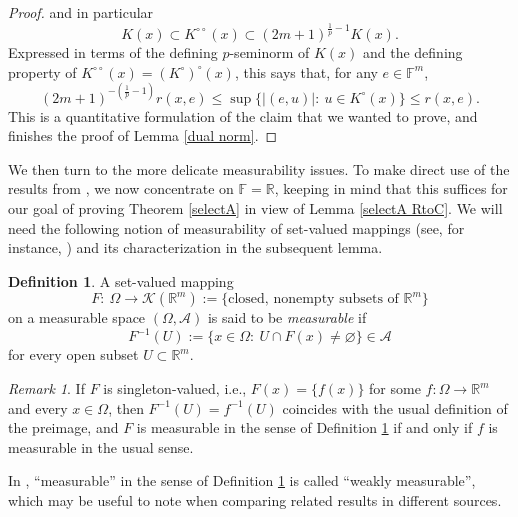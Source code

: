 \documentclass[11pt, reqno]{amsart}
\theoremstyle{definition}
\newtheorem{definition}[theorem]{Definition}
\theoremstyle{remark}
\newtheorem{remark}[theorem]{Remark}
\numberwithin{equation}{section}
\newcommand{\As}{\mathcal A}
\newcommand{\F}{\mathbb F}
\newcommand{\R}{\mathbb R}
\begin{document}
\begin{proof}
and in particular
\begin{equation*}
K(x)\subset K^{\circ\circ}(x)\subset (2m+1)^{\frac1p-1}K(x).
\end{equation*}
Expressed in terms of the defining $p$-seminorm of $K(x)$
and the defining property of $K^{\circ\circ}(x)=(K^{\circ})^{\circ}(x)$,
this says that, for any $e\in \mathbb F^m$,
\begin{equation*}
(2m+1)^{-(\frac1p-1)}r(x,e)
\leq \sup\{|(e,u)|:\ u\in K^{\circ}(x)\}
\leq r(x,e).
\end{equation*}
This is a quantitative formulation of the claim that we wanted to prove, and finishes the proof of Lemma \ref{dual norm}.
\end{proof}

We then turn to the more delicate measurability issues.
To make direct use of the results from \cite{BCU},
we now concentrate on $\F=\R$, keeping in mind that
this suffices for our goal of proving Theorem \ref{selectA}
in view of Lemma \ref{selectA RtoC}. We will need
the following notion of measurability of set-valued mappings
(see, for instance, \cite[Definition 8.1.1]{AF09})
and its characterization in the subsequent lemma.

\begin{definition}\label{def F meas}
A set-valued mapping
\begin{equation}\label{K(Rm)}
F:\ \Omega\to\mathcal K(\R^m):=\{\text{closed, nonempty subsets of }\R^m\}
\end{equation}
on a measurable space $(\Omega,\As)$ is said to be {\em measurable} if
\begin{equation*}
F^{-1}(U):=\{x\in\Omega:\ U\cap F(x)\neq\varnothing\}\in\As
\end{equation*}
for every open subset $U\subset\R^m$.
\end{definition}

\begin{remark}
If $F$ is singleton-valued, i.e., $F(x)=\{f(x)\}$ for some $f:\Omega\to\R^m$ and every $x\in\Omega$, then $F^{-1}(U)=f^{-1}(U)$ coincides with the usual definition of the preimage, and $F$ is measurable in the sense of Definition \ref{def F meas} if and only if $f$ is measurable in the usual sense.

In \cite[Definition 1.1]{Graf}, ``measurable'' in the sense of Definition \ref{def F meas} is called ``weakly measurable'', which may be useful to note when comparing related results in different sources.
\end{remark}
\end{document}
